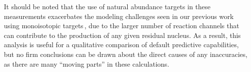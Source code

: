 It should be noted that the use of natural abundance targets in these measurements exacerbates the modeling  challenges seen in our previous work using monoisotopic targets\,\cite{Voyles2018a}, 
due to the larger number  of reaction channels that can contribute to the production of any given residual nucleus.
As a result, this analysis is useful for a qualitative comparison of default predictive capabilities, but no firm conclusions can be drawn about the direct causes of any inaccuracies, as there are many \enquote{moving parts} in these calculations.





% 








